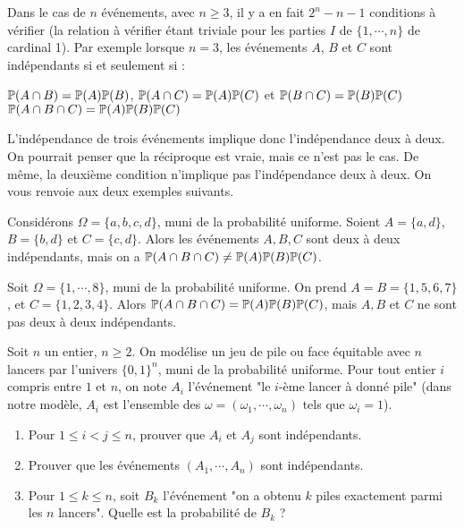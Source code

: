 \documentclass[12pt,a4paper]{report}
\begin{document}
\begin{remarque}{}
Dans le cas de $n$ événements, avec $n \ge 3$, il y a en fait $2^n-n-1$ conditions à vérifier (la relation à vérifier étant triviale pour les parties $I$ de $\{1,\cdots,n\}$ de cardinal 1). Par exemple lorsque $n = 3$, les événements $A$, $B$ et $C$ sont indépendants si et seulement si :
\begin{center}
$\mathbb{P}(A \cap B) = \mathbb{P}(A) \mathbb{P}(B)$, $\mathbb{P}(A \cap C) = \mathbb{P}(A) \mathbb{P}(C)$ et $\mathbb{P}(B \cap C) = \mathbb{P}(B) \mathbb{P}(C)$ \\
$\mathbb{P}(A \cap B \cap C) = \mathbb{P}(A)\mathbb{P}(B) \mathbb{P}(C)$
\end{center}
\end{remarque}

L'indépendance de trois événements implique donc l'indépendance deux à deux. On pourrait penser que la réciproque est vraie, mais ce n'est pas le cas. De même, la deuxième condition n'implique pas l'indépendance deux à deux. On vous renvoie aux deux exemples suivants.

\begin{exemple}{}
Considérons $\Omega = \{a,b,c,d\}$, muni de la probabilité uniforme. Soient $A = \{a,d\}$, $B = \{b,d\}$ et $C = \{c,d\}$. Alors les événements $A,B,C$ sont deux à deux indépendants, mais on a $\mathbb{P}(A\cap B \cap C) \ne \mathbb{P}(A)\mathbb{P}(B)\mathbb{P}(C)$.
\end{exemple}

\begin{exemple}{}
Soit $\Omega = \{1,\cdots,8\}$, muni de la probabilité uniforme. On prend $A = B = \{1,5,6,7\}$, et $C = \{1,2,3,4\}$. Alors $\mathbb{P}(A \cap B \cap C) = \mathbb{P}(A) \mathbb{P}(B) \mathbb{P}(C)$, mais $A,B$ et $C$ ne sont pas deux à deux indépendants.
\end{exemple}

\begin{exemple}[Exercice 7]{}
Soit $n$ un entier, $n \ge 2$. On modélise un jeu de pile ou face équitable avec $n$ lancers par l'univers $\{0,1\}^n$, muni de la probabilité uniforme. Pour tout entier $i$ compris entre $1$ et $n$, on note $A_i$ l'événement "le $i$-ème lancer à donné pile" (dans notre modèle, $A_i$ est l'ensemble des $\omega = (\omega_1,\cdots,\omega_n)$ tels que $\omega_i = 1$).
\begin{enumerate}
	\item Pour $1 \le i < j \le n$, prouver que $A_i$ et $A_j$ sont indépendants.
	\item Prouver que les événements $(A_1,\cdots,A_n)$ sont indépendants.
	\item Pour $1 \le k \le n$, soit $B_k$ l'événement "on a obtenu $k$ piles exactement parmi les $n$ lancers". Quelle est la probabilité de $B_k$ ?
\end{enumerate}
\end{exemple}
\end{document}
